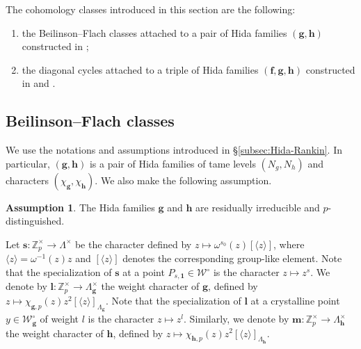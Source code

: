 \documentclass[a4paper,11pt]{amsart}
\theoremstyle{plain}
\theoremstyle{definition}
\newtheorem{ass}[theorem]{Assumption}
\theoremstyle{remark}
\newcommand{\bb}{\mathbb}
\newcommand{\cl}{\mathcal}
\DeclareMathOperator{\Eis}{Eis}
\newcommand{\hf}{{\mathbf{f}}}
\newcommand{\hg}{{\mathbf{g}}}
\newcommand{\hh}{{\mathbf h}}
\numberwithin{equation}{section}
\begin{document}
The cohomology classes introduced in this section are the following:
\begin{enumerate}
\item[(a)] the Beilinson--Flach classes attached to a pair of Hida families $(\hg,\hh)$ constructed in \cite{KLZ};%
\item[(b)] the diagonal cycles attached to a triple of Hida families $(\hf,\hg,\hh)$ constructed in \cite{BSV} and \cite{DR3}. %
\end{enumerate}


\subsection{Beilinson--Flach classes}\label{subsec:BF}

We use the notations and assumptions introduced in \S\ref{subsec:Hida-Rankin}. In particular, $(\hg,\hh)$ is a pair of Hida families of tame levels $(N_g,N_h)$ and characters $(\chi_\hg,\chi_\hh)$. 
We also make the following assumption.

\begin{ass}
    The Hida families $\hg$ and $\hh$ are residually irreducible and $p$-distinguished.
\end{ass}

Let $\mathbf{s}:\bb{Z}_p^\times\rightarrow \Lambda^\times$ be the character defined by $z\mapsto \omega^{s_0}(z)[\langle z\rangle]$, where $\langle z\rangle =\omega^{-1}(z)z$ and $[\langle z\rangle]$ denotes the corresponding group-like element. Note that the specialization of $\mathbf{s}$ at a point $P_{s,\bm{1}}\in \cl{W}^\circ$ is the character $z\mapsto z^s$. We denote by $\mathbf{l}:\bb{Z}_p^\times\rightarrow \Lambda_\hg^\times$ the weight character of $\hg$, defined by $z\mapsto \chi_{\hg,p}(z) z^2[\langle z\rangle]_{\Lambda_{\hg}}$. Note that the specialization of $\mathbf{l}$ at a crystalline point $y\in \cl{W}_{\hg}^\circ$ of weight $l$ is the character $z\mapsto z^l$. Similarly, we denote by $\mathbf{m}:\bb{Z}_p^\times \rightarrow \Lambda_\hh^\times$ the weight character of $\hh$, defined by $z\mapsto \chi_{\hh,p}(z)z^2[\langle z\rangle]_{\Lambda_{\hh}}$.
\end{document}
